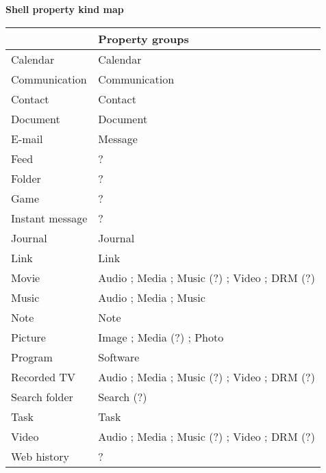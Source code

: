 \documentclass[12pt]{article}
\begin{document}
\begin{center}

\Huge

\textbf{Shell property kind map}

\end{center}

\renewcommand{\tabularxcolumn}[1]{>{\arraybackslash}m{#1}}

\keepXColumns 

\begin{tabularx}{\linewidth}{ | X | X | }

\hline

\rowcolor{Gray} \multicolumn{1}{|c|}{Kind} & Property groups \\

\hline

\endhead %

Calendar & Calendar \\

Communication & Communication \\

Contact & Contact \\

Document & Document \\

E-mail & Message \\

Feed & ? \\

Folder & ? \\

Game & ? \\

Instant message & ? \\

Journal & Journal \\

Link & Link \\

Movie & Audio ; Media ; Music (?) ; Video ; DRM (?) \\

Music & Audio ; Media ; Music \\

Note & Note \\

Picture & Image ; Media (?) ; Photo \\

Program & Software \\

Recorded TV & Audio ; Media ; Music (?) ; Video ; DRM (?) \\

Search folder & Search (?) \\

Task & Task \\

Video & Audio ; Media ; Music (?) ; Video ; DRM (?) \\

Web history & ? \\

\hline

\end{tabularx}
\end{document}
